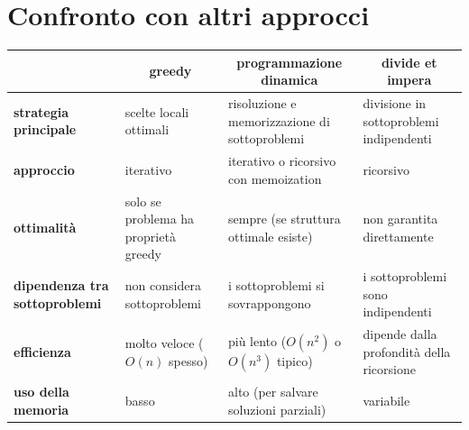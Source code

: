 \section{Confronto con altri approcci}
\begin{table}[ht]
    \centering
    \renewcommand{\arraystretch}{1.3} 
    
    \begin{tabularx}{\textwidth}{|p{3.2cm}|X|X|X|}
        \hline
        
        \rowcolor{SALZO} 
        
        \multicolumn{1}{|c|}{\textbf{caratteristica}} & 
        \multicolumn{1}{c|}{\textbf{greedy}} & 
        \multicolumn{1}{c|}{\textbf{programmazione dinamica}} & 
        \multicolumn{1}{c|}{\textbf{divide et impera}} \\ 
        \hline
        
        \textbf{strategia principale} & 
        scelte locali ottimali & 
        risoluzione e memorizzazione di sottoproblemi & 
        divisione in sottoproblemi indipendenti \\ 
        \hline
        
        \textbf{approccio} & 
        iterativo & 
        iterativo o ricorsivo con memoization & 
        ricorsivo \\ 
        \hline
        
        \textbf{ottimalità} & 
        solo se problema ha proprietà greedy & 
        sempre (se struttura ottimale esiste) & 
        non garantita direttamente \\ 
        \hline
        
        \textbf{dipendenza tra sottoproblemi} & 
        non considera sottoproblemi & 
        i sottoproblemi si sovrappongono & 
        i sottoproblemi sono indipendenti \\ 
        \hline
        
        \textbf{efficienza} & 
        molto veloce ($O(n)$ spesso) & 
        più lento ($O(n^2)$ o $O(n^3)$ tipico) & 
        dipende dalla profondità della ricorsione \\ 
        \hline
        
        \textbf{uso della memoria} & 
        basso & 
        alto (per salvare soluzioni parziali) & 
        variabile \\ 
        \hline
        

\end{tabularx}
\end{table}
